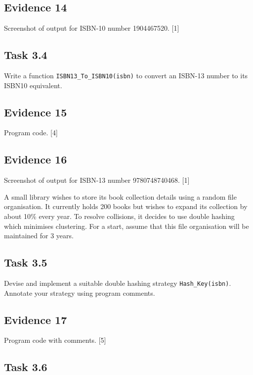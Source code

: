 \subsection*{Evidence 14 }

Screenshot of output for ISBN-10 number 1904467520. \hfill{}{[}1{]}

\subsection*{Task 3.4}

Write a function \texttt{ISBN13\_To\_ISBN10(isbn)} to convert an ISBN-13
number to its ISBN10 equivalent.

\subsection*{Evidence 15 }

Program code. \hfill{}{[}4{]}

\subsection*{Evidence 16 }

Screenshot of output for ISBN-13 number 9780748740468. \hfill{} {[}1{]}

A small library wishes to store its book collection details using
a random file organisation. It currently holds 200 books but wishes
to expand its collection by about 10\% every year. To resolve collisions,
it decides to use double hashing which minimises clustering. For a
start, assume that this file organisation will be maintained for 3
years. 

\subsection*{Task 3.5 }

Devise and implement a suitable double hashing strategy \texttt{Hash\_Key(isbn)}.
Annotate your strategy using program comments. 

\subsection*{Evidence 17}

Program code with comments. \hfill{}{[}5{]}

\subsection*{Task 3.6}

